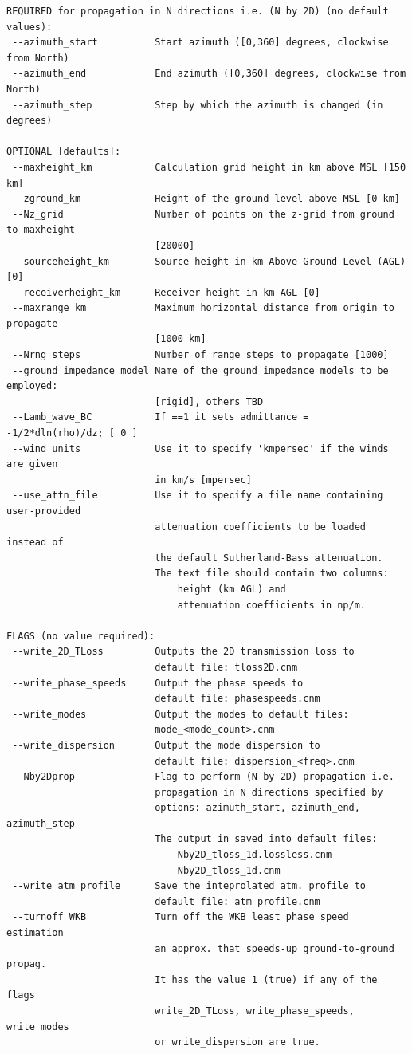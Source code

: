 \begin{verbatim}
REQUIRED for propagation in N directions i.e. (N by 2D) (no default values):
 --azimuth_start          Start azimuth ([0,360] degrees, clockwise from North)
 --azimuth_end            End azimuth ([0,360] degrees, clockwise from North)
 --azimuth_step           Step by which the azimuth is changed (in degrees)

OPTIONAL [defaults]:
 --maxheight_km           Calculation grid height in km above MSL [150 km]
 --zground_km             Height of the ground level above MSL [0 km]
 --Nz_grid                Number of points on the z-grid from ground to maxheight
                          [20000]
 --sourceheight_km        Source height in km Above Ground Level (AGL) [0]
 --receiverheight_km      Receiver height in km AGL [0]
 --maxrange_km            Maximum horizontal distance from origin to propagate
                          [1000 km]
 --Nrng_steps             Number of range steps to propagate [1000]
 --ground_impedance_model Name of the ground impedance models to be employed:
                          [rigid], others TBD
 --Lamb_wave_BC           If ==1 it sets admittance = -1/2*dln(rho)/dz; [ 0 ]
 --wind_units             Use it to specify 'kmpersec' if the winds are given 
                          in km/s [mpersec]
 --use_attn_file          Use it to specify a file name containing user-provided
                          attenuation coefficients to be loaded instead of 
                          the default Sutherland-Bass attenuation. 
                          The text file should contain two columns: 
                              height (km AGL) and 
                              attenuation coefficients in np/m.

FLAGS (no value required):
 --write_2D_TLoss         Outputs the 2D transmission loss to
                          default file: tloss2D.cnm
 --write_phase_speeds     Output the phase speeds to
                          default file: phasespeeds.cnm
 --write_modes            Output the modes to default files:
                          mode_<mode_count>.cnm
 --write_dispersion       Output the mode dispersion to
                          default file: dispersion_<freq>.cnm
 --Nby2Dprop              Flag to perform (N by 2D) propagation i.e.
                          propagation in N directions specified by
                          options: azimuth_start, azimuth_end, azimuth_step 
                          The output in saved into default files: 
                              Nby2D_tloss_1d.lossless.cnm
                              Nby2D_tloss_1d.cnm
 --write_atm_profile      Save the inteprolated atm. profile to
                          default file: atm_profile.cnm
 --turnoff_WKB            Turn off the WKB least phase speed estimation
                          an approx. that speeds-up ground-to-ground propag.
                          It has the value 1 (true) if any of the flags
                          write_2D_TLoss, write_phase_speeds, write_modes
                          or write_dispersion are true.



\end{verbatim}
